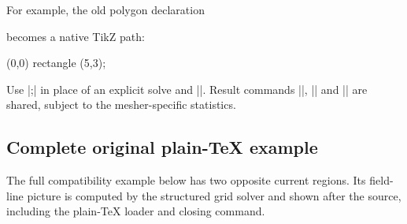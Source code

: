 For example, the old polygon declaration
\begin{codeexample}
\end{codeexample}
becomes a native TikZ path:
\begin{codeexample}
\filldraw[femm/region={material=iron}] (0,0) rectangle (5,3);
\end{codeexample}
Use |;| in place of an explicit solve and
|\femmfieldlines|. Result commands |\femmB|, |\femmstat| and
|\femmmeshstat| are shared, subject to the mesher-specific statistics.

\subsection{Complete original plain-TeX example}
The full compatibility example below has two opposite current regions.
Its field-line picture is computed by the structured grid solver and
shown after the source, including the plain-TeX loader and closing command.
